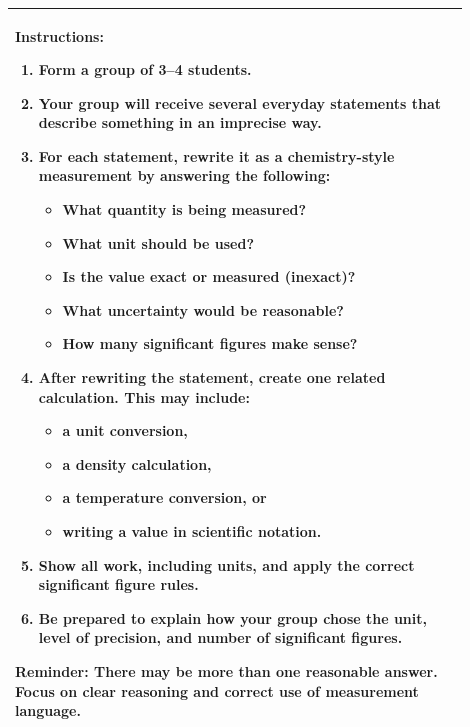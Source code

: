 \documentclass{article}
\begin{document}
\begin{tabular}{|p{0.9\linewidth}|}
\textbf{Instructions:}
\begin{enumerate}
    \item Form a group of 3--4 students.
    \item Your group will receive several everyday statements that describe something in an imprecise way.
    \item For each statement, rewrite it as a chemistry-style measurement by answering the following:
    \begin{itemize}
        \item What quantity is being measured?
        \item What unit should be used?
        \item Is the value exact or measured (inexact)?
        \item What uncertainty would be reasonable?
        \item How many significant figures make sense?
    \end{itemize}
    \item After rewriting the statement, create one related calculation. This may include:
    \begin{itemize}
        \item a unit conversion,
        \item a density calculation,
        \item a temperature conversion, or
        \item writing a value in scientific notation.
    \end{itemize}
    \item Show all work, including units, and apply the correct significant figure rules.
    \item Be prepared to explain how your group chose the unit, level of precision, and number of significant figures.
\end{enumerate}

\textbf{Reminder:}
There may be more than one reasonable answer. Focus on clear reasoning and correct use of measurement language. \\
\hline
\end{tabular}
\newpage
\end{document}

